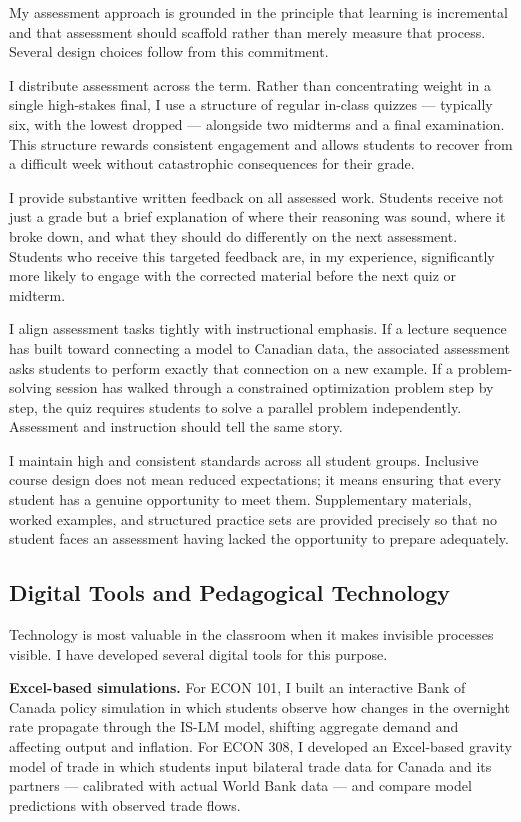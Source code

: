 \documentclass[11pt,letterpaper]{article}
\begin{document}
My assessment approach is grounded in the principle that learning is incremental and that assessment should scaffold rather than merely measure that process. Several design choices follow from this commitment.

I distribute assessment across the term. Rather than concentrating weight in a single high-stakes final, I use a structure of regular in-class quizzes --- typically six, with the lowest dropped --- alongside two midterms and a final examination. This structure rewards consistent engagement and allows students to recover from a difficult week without catastrophic consequences for their grade.

I provide substantive written feedback on all assessed work. Students receive not just a grade but a brief explanation of where their reasoning was sound, where it broke down, and what they should do differently on the next assessment. Students who receive this targeted feedback are, in my experience, significantly more likely to engage with the corrected material before the next quiz or midterm.

I align assessment tasks tightly with instructional emphasis. If a lecture sequence has built toward connecting a model to Canadian data, the associated assessment asks students to perform exactly that connection on a new example. If a problem-solving session has walked through a constrained optimization problem step by step, the quiz requires students to solve a parallel problem independently. Assessment and instruction should tell the same story.

I maintain high and consistent standards across all student groups. Inclusive course design does not mean reduced expectations; it means ensuring that every student has a genuine opportunity to meet them. Supplementary materials, worked examples, and structured practice sets are provided precisely so that no student faces an assessment having lacked the opportunity to prepare adequately.

\subsection{Digital Tools and Pedagogical Technology}

Technology is most valuable in the classroom when it makes invisible processes visible. I have developed several digital tools for this purpose.

\textbf{Excel-based simulations.} For ECON 101, I built an interactive Bank of Canada policy simulation in which students observe how changes in the overnight rate propagate through the IS-LM model, shifting aggregate demand and affecting output and inflation. For ECON 308, I developed an Excel-based gravity model of trade in which students input bilateral trade data for Canada and its partners --- calibrated with actual World Bank data --- and compare model predictions with observed trade flows.
\end{document}
